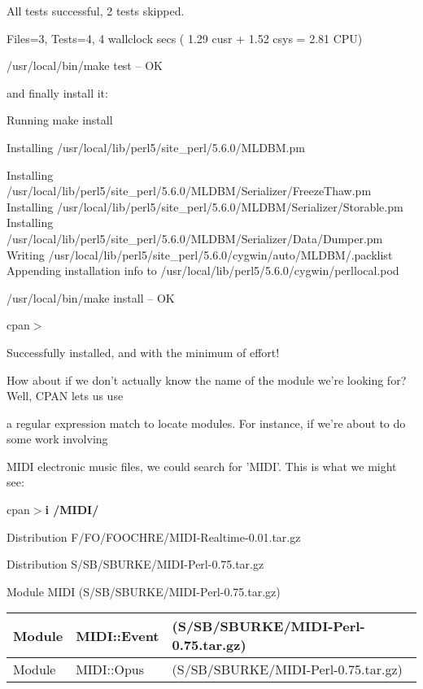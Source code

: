 \documentclass[a4paper,11pt]{book}
\begin{document}
\noindent All tests successful, 2 tests skipped.

\noindent Files=3, Tests=4,  4 wallclock secs ( 1.29 cusr +  1.52 csys =  2.81 CPU)

\noindent /usr/local/bin/make test -- OK

\noindent 

\noindent and finally install it:

\noindent 

\noindent Running make install

\noindent Installing /usr/local/lib/perl5/site\_perl/5.6.0/MLDBM.pm

\noindent Installing /usr/local/lib/perl5/site\_perl/5.6.0/MLDBM/Serializer/FreezeThaw.pm Installing /usr/local/lib/perl5/site\_perl/5.6.0/MLDBM/Serializer/Storable.pm Installing /usr/local/lib/perl5/site\_perl/5.6.0/MLDBM/Serializer/Data/Dumper.pm Writing /usr/local/lib/perl5/site\_perl/5.6.0/cygwin/auto/MLDBM/.packlist Appending installation info to /usr/local/lib/perl5/5.6.0/cygwin/perllocal.pod

\noindent /usr/local/bin/make install  -- OK

\noindent 

\noindent cpan$>$

\noindent 

\noindent Successfully installed, and with the minimum of effort!

\noindent 

\noindent How about if we don't actually know the name of the module we're looking for? Well, CPAN lets us use

\noindent a regular expression match to locate modules. For instance, if we're about to do some work involving

\noindent MIDI electronic music files, we could search for 'MIDI'. This is what we might see:

\noindent 

\noindent cpan$>$\textbf{i /MIDI/}

\noindent Distribution F/FO/FOOCHRE/MIDI-Realtime-0.01.tar.gz

\noindent Distribution S/SB/SBURKE/MIDI-Perl-0.75.tar.gz

\noindent Module MIDI (S/SB/SBURKE/MIDI-Perl-0.75.tar.gz)

\begin{tabular}{|p{0.7in}|p{0.7in}|p{1.6in}|} \hline 
Module & MIDI::Event & (S/SB/SBURKE/MIDI-Perl-0.75.tar.gz) \\ \hline 
Module & MIDI::Opus & (S/SB/SBURKE/MIDI-Perl-0.75.tar.gz) \\ \hline 
\end{tabular}
\end{document}
